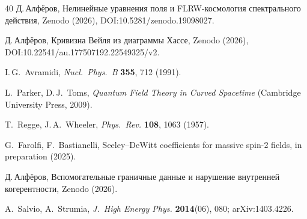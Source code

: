 \documentclass[12pt,a4paper]{article}
\theoremstyle{plain}
\theoremstyle{definition}
\begin{document}
\begin{thebibliography}{40}
Д.\,Алфёров,
Нелинейные уравнения поля и FLRW-космология
спектрального действия,
Zenodo (2026), DOI:10.5281/zenodo.19098027.

Д.\,Алфёров,
Кривизна Вейля из диаграммы Хассе,
Zenodo (2026), DOI:10.22541/au.177507192.22549325/v2.

I.\,G.~Avramidi,
\textit{Nucl.\ Phys.\ B} \textbf{355}, 712 (1991).

L.~Parker, D.\,J.~Toms,
\textit{Quantum Field Theory in Curved Spacetime}
(Cambridge University Press, 2009).

T.~Regge, J.\,A.~Wheeler,
\textit{Phys.\ Rev.} \textbf{108}, 1063 (1957).

G.~Farolfi, F.~Bastianelli,
Seeley--DeWitt coefficients for massive spin-2 fields,
in preparation (2025).

Д.\,Алфёров,
Вспомогательные граничные данные и нарушение внутренней
когерентности,
Zenodo (2026).

A.~Salvio, A.~Strumia,
\textit{J.\ High Energy Phys.} \textbf{2014}(06), 080;
arXiv:1403.4226.

\end{thebibliography}
\end{document}
